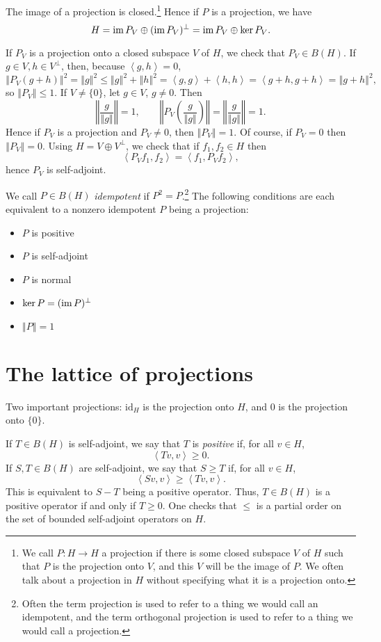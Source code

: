 \documentclass{article}
\newcommand{\inner}[2]{\left\langle #1, #2 \right\rangle}
\newcommand{\im}{\textrm{im\,}}
\newcommand{\id}{\textrm{id}}
\newcommand{\norm}[1]{\left\Vert #1 \right\Vert}
\begin{document}
The image of a projection is closed.\footnote{We call $P:H \to H$ a projection if there is some closed subspace $V$ of $H$ such that $P$ is the projection onto $V$, and this $V$ will be the image of $P$. We often talk about a projection in $H$ without specifying what it is a projection onto.}
Hence if $P$ is a projection, we have
\[
H=\im P_V \oplus (\im P_V)^\perp = \im P_V \oplus \ker P_V.
\]


If $P_V$ is a projection onto a closed subspace $V$ of $H$,
we check that
$P_V \in B(H)$. If $g \in V, h \in V^\perp$, then, because $\inner{g}{h}=0$,
\[
\norm{P_V(g+h)}^2=\norm{g}^2 \leq \norm{g}^2+\norm{h}^2 =\inner{g}{g}+\inner{h}{h}=\inner{g+h}{g+h}=\norm{g+h}^2,
\] 
so $\norm{P_V} \leq 1$. If $V \neq \{0\}$, let $g \in V$, $g \neq 0$. Then
\[
\norm{\frac{g}{\norm{g}}}=1, \qquad \norm{P_V \left( \frac{g}{\norm{g}} \right)}=\norm{\frac{g}{\norm{g}}}=1.
\]
Hence if $P_V$ is a projection and $P_V \neq 0$, then $\norm{P_V}=1$. Of course, if $P_V=0$ then $\norm{P_V}=0$. 
Using $H=V \oplus V^\perp$, we check that
if  $f_1,f_2 \in H$ then
\[
\inner{P_V f_1}{f_2}=\inner{f_1}{P_V f_2},
\]
hence  $P_V$ is self-adjoint.


We call $P \in B(H)$  {\em idempotent} if $P^2=P$.\footnote{Often the term projection is used to refer to a thing we would call an idempotent, and the term orthogonal projection is used to refer to a thing   we would call a projection.} The following conditions are each equivalent to a nonzero idempotent $P$ being a  projection:
\begin{itemize}
\item $P$ is positive
\item $P$ is self-adjoint
\item $P$ is normal
\item $\ker P=(\im P)^\perp$
\item $\norm{P}=1$
\end{itemize}





\section{The lattice of projections}
Two important projections: $\id_H$ is the projection onto $H$, and $0$ is the projection onto $\{0\}$. 


If $T \in B(H)$ is self-adjoint, we say that $T$ is  {\em positive}  if, for all $v \in H$,
\[
\inner{Tv}{v} \geq 0.
\]
If $S,T \in B(H)$ are self-adjoint, we say that $S \geq T$ if, for all $v \in H$,
\[
\inner{Sv}{v} \geq \inner{Tv}{v}.
\]
This is equivalent to $S-T$ being a positive operator. Thus, $T \in B(H)$ is a positive operator if and only if $T \geq 0$. 
One checks that $\leq$ is a partial order on the set of bounded self-adjoint operators on $H$. 
\end{document}

